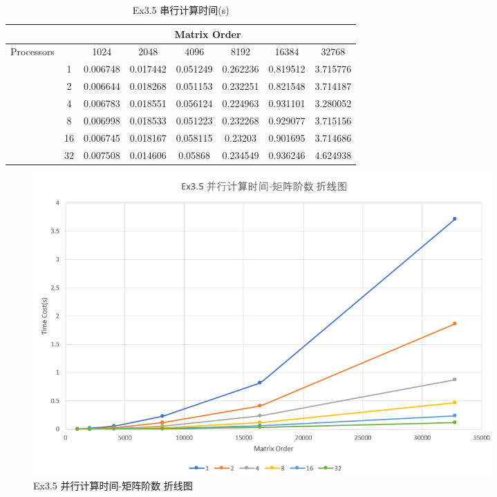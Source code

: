 \documentclass[UTF8]{article}
\begin{document}
\begin{table}[h]
    \caption{Ex3.5 串行计算时间(s)}
    \label{tab:my-table}
    \centering
    \scalebox{0.8} {
    \begin{tabular}{|c|c|c|c|c|c|c|c|}
    \hline
                                & \multicolumn{7}{c|}{Matrix Order}                                    \\ \hline
    \multirow{7}{*}{Processors} &    & 1024     & 2048     & 4096     & 8192     & 16384    & 32768    \\ \cline{2-8} 
                                & 1  & 0.006748 & 0.017442 & 0.051249 & 0.262236 & 0.819512 & 3.715776 \\ \cline{2-8} 
                                & 2  & 0.006644 & 0.018268 & 0.051153 & 0.232251 & 0.821548 & 3.714187 \\ \cline{2-8} 
                                & 4  & 0.006783 & 0.018551 & 0.056124 & 0.224963 & 0.931101 & 3.280052 \\ \cline{2-8} 
                                & 8  & 0.006998 & 0.018533 & 0.051223 & 0.232268 & 0.929077 & 3.715156 \\ \cline{2-8} 
                                & 16 & 0.006745 & 0.018167 & 0.058115 & 0.23203  & 0.901695 & 3.714686 \\ \cline{2-8} 
                                & 32 & 0.007508 & 0.014606 & 0.05868  & 0.234549 & 0.936246 & 4.624938 \\ \hline
    \end{tabular}}
    \end{table}

    \begin{figure}[h]
        \centering
        \includegraphics[width=0.85\textwidth]{35pto.png}
        \caption{Ex3.5 并行计算时间-矩阵阶数 折线图}
    \end{figure}
\end{document}
